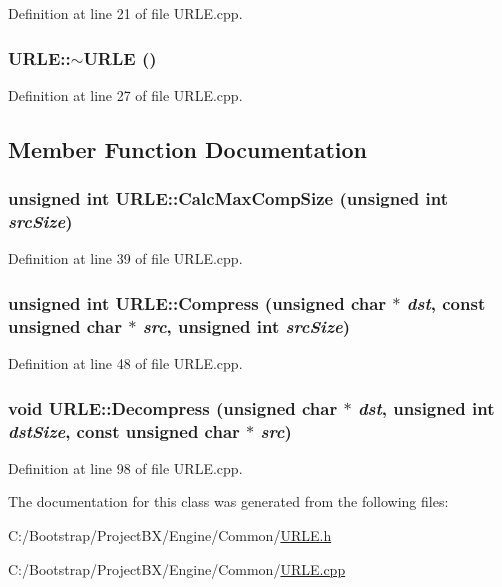 Definition at line 21 of file URLE.cpp.\hypertarget{class_u_r_l_e_a85af2a1c357f24303402ec09aac3ae2}{
\subsubsection[{$\sim$URLE}]{\setlength{\rightskip}{0pt plus 5cm}URLE::$\sim$URLE ()}}
\label{class_u_r_l_e_a85af2a1c357f24303402ec09aac3ae2}




Definition at line 27 of file URLE.cpp.

\subsection{Member Function Documentation}
\hypertarget{class_u_r_l_e_517415db71b4453c352c58ad288cc224}{
\subsubsection[{CalcMaxCompSize}]{\setlength{\rightskip}{0pt plus 5cm}unsigned int URLE::CalcMaxCompSize (unsigned int {\em srcSize})}}
\label{class_u_r_l_e_517415db71b4453c352c58ad288cc224}




Definition at line 39 of file URLE.cpp.\hypertarget{class_u_r_l_e_d41520530d62de1703824d56bb214116}{
\subsubsection[{Compress}]{\setlength{\rightskip}{0pt plus 5cm}unsigned int URLE::Compress (unsigned char $\ast$ {\em dst}, \/  const unsigned char $\ast$ {\em src}, \/  unsigned int {\em srcSize})}}
\label{class_u_r_l_e_d41520530d62de1703824d56bb214116}




Definition at line 48 of file URLE.cpp.\hypertarget{class_u_r_l_e_4be2c4f71c9902b4b9dd8292e74bb58f}{
\subsubsection[{Decompress}]{\setlength{\rightskip}{0pt plus 5cm}void URLE::Decompress (unsigned char $\ast$ {\em dst}, \/  unsigned int {\em dstSize}, \/  const unsigned char $\ast$ {\em src})}}
\label{class_u_r_l_e_4be2c4f71c9902b4b9dd8292e74bb58f}




Definition at line 98 of file URLE.cpp.

The documentation for this class was generated from the following files:\begin{CompactItemize}
\item 
C:/Bootstrap/ProjectBX/Engine/Common/\hyperlink{_u_r_l_e_8h}{URLE.h}\item 
C:/Bootstrap/ProjectBX/Engine/Common/\hyperlink{_u_r_l_e_8cpp}{URLE.cpp}\end{CompactItemize}
